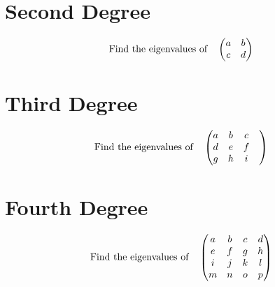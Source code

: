 \documentclass[letterpaper]{article}
\begin{document}
\section*{Second Degree}
\[\qq*{Find the eigenvalues of}
  \begin{pmatrix}
    a & b \\c&d\\
  \end{pmatrix}
\]

\section*{Third Degree}
\[\qq*{Find the eigenvalues of}
  \begin{pmatrix}
    a & b & c & \\d&e&f\\g&h&i\\
  \end{pmatrix}
\]

\section*{Fourth Degree}
\[\qq*{Find the eigenvalues of}
  \begin{pmatrix}
    a & b & c & d \\e&f&g&h\\i&j&k&l\\m&n&o&p\\
  \end{pmatrix}
\]
\end{document}
